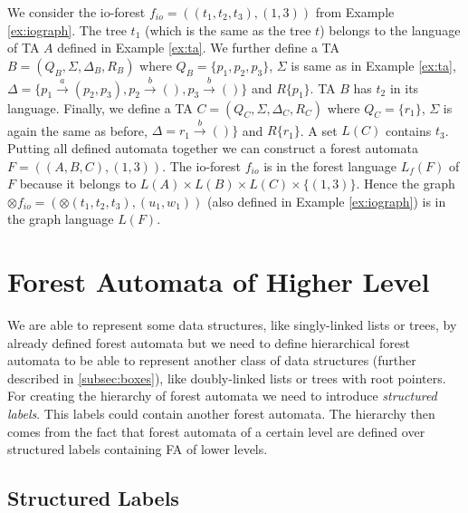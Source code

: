 \bexmp
We consider the io-forest $f_{io}=((t_1,t_2,t_3), (1,3))$ from Example \ref{ex:iograph}.
The tree $t_1$ (which is the same as the tree $t$) belongs to the language of TA $A$
defined in Example \ref{ex:ta}.
We further define a TA $B=(Q_B,\Sigma, \Delta_B, R_B)$ where $Q_B=\{p_1,p_2,p_3\}$,
$\Sigma$ is same as in Example \ref{ex:ta},
$\Delta=\{p_1 \xrightarrow{a} (p_2,p_3),
p_2 \xrightarrow{b} (),
p_3 \xrightarrow{b} ()\}$
and $R\{p_1\}$.
TA $B$ has $t_2$ in its language.
Finally, we define a TA $C=(Q_C,\Sigma, \Delta_C, R_C)$ where $Q_C=\{r_1\}$,
$\Sigma$ is again the same as before,
$\Delta= r_1 \xrightarrow{b} ()\}$
and $R\{r_1\}$.
A set $L(C)$ contains $t_3$.
Putting all defined automata together we can construct a forest automata $F=((A,B,C),(1,3))$.
The io-forest $f_{io}$ is in the forest language $L_f(F)$ of $F$ because it belongs
to $L(A) \times L(B) \times L(C) \times \{(1,3)\}$.
Hence the graph $\otimes f_{io} = (\otimes (t_1,t_2,t_3),(u_1,w_1))$
(also defined in Example \ref{ex:iograph}) is in the graph language $L(F)$.
\eexmp

\section{Forest Automata of Higher Level}
\label{sec:fah}

We are able to represent some data structures, like singly-linked lists or trees, by already defined forest automata
but we need to define hierarchical forest automata to be able to represent
another class of data structures (further described in \ref{subsec:boxes}), like doubly-linked lists or trees with root pointers.
For creating the hierarchy of forest automata we need to introduce \emph{structured labels}.
This labels could contain another forest automata.
The hierarchy then comes from the fact that forest automata of a certain level
are defined over structured labels containing FA of lower levels.

\subsection{Structured Labels}


